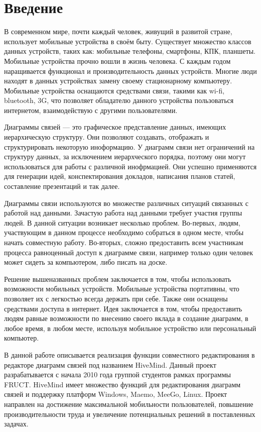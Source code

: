 \newpage

\chapter*{Введение}
\label{chap:introduction}

В современном мире, почти каждый человек, живущий в развитой стране, использует
мобильные устройства в своём быту. Существует множество классов данных
устройств, таких как: мобильные телефоны, смартфоны, КПК, планшеты. Мобильные
устройства прочно вошли в жизнь человека. С каждым годом наращивается функционал
и производительность данных устройств. Многие люди находят в данных устройствах
замену своему стационарному компьютеру. Мобильные устройства оснащаются
средствами связи, такими как wi-fi, bluetooth, 3G, что позволяет обладателю
данного устройства пользоваться интернетом, взаимодействую с другими
пользователями.

Диаграммы связей --- это графическое представление данных, имеющих
иерархическую структуру. Они позволяют создавать, отображать и
структурировать некоторую иноформацию. У диаграмм связи нет ограничений на
структуру данных, за исключением иерархческого порядка, поэтому они могут
использоваться для работы с различной инофрмацией. Они успешно
применяются для генерации идей, конспектирования докладов, написания планов
статей, составление презентаций и так далее.

Диаграммы связи используются во множестве различных ситуаций связанных с работой
над данными. Зачастую работа над данными требует участия группы людей. В данной
ситуации возникает несколько проблем. Во-первых, людям, участвующим в данном
процессе необходимо собраться в одном месте, чтобы начать совместную работу.
Во-вторых, сложно предоставить всем участникам процесса равноценный доступ к
диаграмме связи, например только один человек может сидеть за компьютером, либо
писать на доске.

Решение вышеназванных проблем заключается в том, чтобы использовать возможности
мобильных устройств. Мобильные устройства портативны, что позволяет их с
легкостью всегда держать при себе. Также они оснащены средствами доступа в
интернет. Идея заключается в том, чтобы предоставить людям равные возможности по
внесению своего вклада в создание диаграмм, в любое время, в любом месте,
используя мобильное устройство или персональный компьютер.

В данной работе описывается реализация функции совместного редактирования в
редакторе диаграмм связей под названием HiveMind. Данный проект разрабатывается
с начала 2010 года группой студентов рамках программы FRUCT. HiveMind имеет
множество функций для редактирования диаграмм связей и поддержку платформ
Windows, Maemo, MeeGo, Linux. Проект направлен на достижение максимальной
мобильности пользователей, повышение производительности труда и увеличение
потенциальных решений в поставленных задачах.

